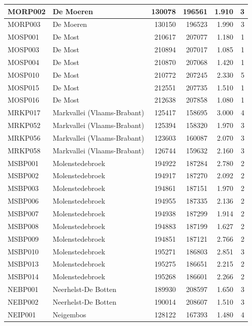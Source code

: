 \documentclass[11pt,]{book}
\begin{document}
\begin{table}
\begin{tabular}[t]{l|l|r|r|r|r}
\hline
MORP002 & De Moeren & 130078 & 196561 & 1.910 & 3\\
\hline
MORP003 & De Moeren & 130150 & 196523 & 1.990 & 3\\
\hline
MOSP001 & De Most & 210617 & 207077 & 1.180 & 1\\
\hline
MOSP003 & De Most & 210894 & 207017 & 1.085 & 1\\
\hline
MOSP004 & De Most & 210870 & 207068 & 1.420 & 1\\
\hline
MOSP010 & De Most & 210772 & 207245 & 2.330 & 5\\
\hline
MOSP015 & De Most & 212551 & 207735 & 1.510 & 1\\
\hline
MOSP016 & De Most & 212638 & 207858 & 1.080 & 1\\
\hline
MRKP017 & Markvallei (Vlaams-Brabant) & 125417 & 158695 & 3.000 & 4\\
\hline
MRKP052 & Markvallei (Vlaams-Brabant) & 125394 & 158320 & 1.970 & 3\\
\hline
MRKP056 & Markvallei (Vlaams-Brabant) & 123603 & 160087 & 2.070 & 3\\
\hline
MRKP058 & Markvallei (Vlaams-Brabant) & 126744 & 159632 & 2.160 & 3\\
\hline
MSBP001 & Molenstedebroek & 194922 & 187284 & 2.780 & 2\\
\hline
MSBP002 & Molenstedebroek & 194917 & 187270 & 2.092 & 2\\
\hline
MSBP003 & Molenstedebroek & 194861 & 187151 & 1.970 & 2\\
\hline
MSBP006 & Molenstedebroek & 194955 & 187335 & 2.136 & 2\\
\hline
MSBP007 & Molenstedebroek & 194938 & 187299 & 1.914 & 2\\
\hline
MSBP008 & Molenstedebroek & 194883 & 187199 & 1.627 & 2\\
\hline
MSBP009 & Molenstedebroek & 194851 & 187121 & 2.766 & 2\\
\hline
MSBP010 & Molenstedebroek & 195271 & 186803 & 2.851 & 3\\
\hline
MSBP013 & Molenstedebroek & 195275 & 186651 & 2.215 & 2\\
\hline
MSBP014 & Molenstedebroek & 195268 & 186601 & 2.266 & 2\\
\hline
NEBP001 & Neerhelst-De Botten & 189930 & 208597 & 1.650 & 3\\
\hline
NEBP002 & Neerhelst-De Botten & 190014 & 208607 & 1.510 & 3\\
\hline
NEIP001 & Neigembos & 128122 & 167393 & 1.480 & 4\\

\end{tabular}
\end{table}
\end{document}
